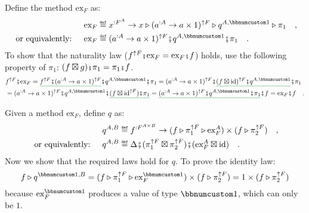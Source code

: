 Define the method $\text{ex}_{F}$ as:
\begin{align*}
 & \text{ex}_{F}\triangleq x^{:F^{A}}\rightarrow x\triangleright(a^{:A}\rightarrow a\times1)^{\uparrow F}\triangleright q^{A,\bbnum 1}\triangleright\pi_{1}\quad,\\
\text{ or equivalently: }\quad & \text{ex}_{F}\triangleq(a^{:A}\rightarrow a\times1)^{\uparrow F}\bef q^{A,\bbnum 1}\bef\pi_{1}\quad.
\end{align*}
To show that the naturality law ($f^{\uparrow F}\bef\text{ex}_{F}=\text{ex}_{F}\bef f$)
holds, use the following property of $\pi_{1}$: $(f\boxtimes g)\bef\pi_{1}=\pi_{1}\bef f$.
\begin{align*}
 & f^{\uparrow F}\bef\text{ex}_{F}=\gunderline{f^{\uparrow F}\bef(a^{:A}\rightarrow a\times1)^{\uparrow F}}\bef q^{A,\bbnum 1}\bef\pi_{1}=(a^{:A}\rightarrow a\times1)^{\uparrow F}\bef\gunderline{(f\boxtimes\text{id})^{\uparrow F}\bef q^{A,\bbnum 1}}\bef\pi_{1}\\
 & =(a^{:A}\rightarrow a\times1)^{\uparrow F}\bef q^{A,\bbnum 1}\bef\gunderline{(f\boxtimes\text{id}^{\uparrow F})\bef\pi_{1}}=\gunderline{(a^{:A}\rightarrow a\times1)^{\uparrow F}\bef q^{A,\bbnum 1}\bef\pi_{1}}\bef f=\text{ex}_{F}\bef f\quad.
\end{align*}

Given a method $\text{ex}_{F}$, define $q$ as:
\begin{align*}
 & q^{A,B}\triangleq f^{:F^{A\times B}}\rightarrow(f\triangleright\pi_{1}^{\uparrow F}\triangleright\text{ex}_{F}^{A})\times(f\triangleright\pi_{2}^{\uparrow F})\quad,\\
\text{ or equivalently: }\quad & q^{A,B}\triangleq\Delta\bef(\pi_{1}^{\uparrow F}\boxtimes\pi_{2}^{\uparrow F})\bef(\text{ex}_{F}^{A}\boxtimes\text{id})\quad.
\end{align*}
Now we show that the required laws hold for $q$. To prove the identity
law: 
\[
f\triangleright q^{\bbnum 1,B}=(f\triangleright\pi_{1}^{\uparrow F}\triangleright\text{ex}_{F}^{\bbnum 1})\times(f\triangleright\pi_{2}^{\uparrow F})=1\times(f\triangleright\pi_{2}^{\uparrow F})
\]
because $\text{ex}_{F}^{\bbnum 1}$ produces a value of type $\bbnum 1$,
which can only be $1$.

